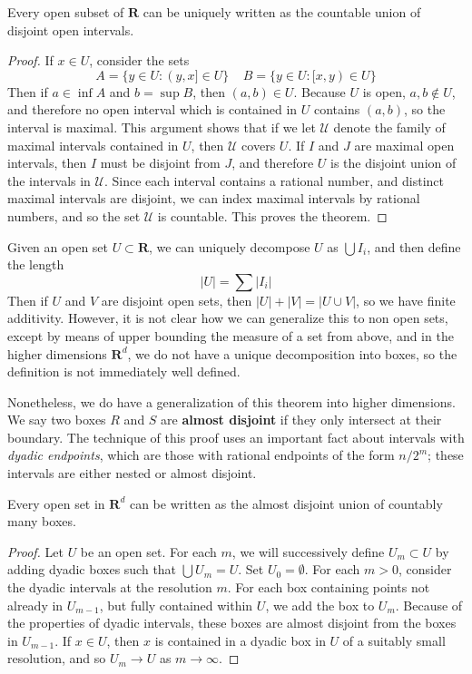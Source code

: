 \begin{theorem}
  Every open subset of $\mathbf{R}$ can be uniquely written as the countable union of disjoint open intervals.
\end{theorem}
\begin{proof}
  If $x \in U$, consider the sets
  \[ A = \{ y \in U: (y,x] \in U \}\ \ \ \ \ B = \{ y \in U: [x,y) \in U \} \]
  Then if $a \in \inf A$ and $b = \sup B$, then $(a,b) \in U$. Because $U$ is open, $a,b \not \in U$, and therefore no open interval which is contained in $U$ contains $(a,b)$, so the interval is maximal. This argument shows that if we let $\mathcal{U}$ denote the family of maximal intervals contained in $U$, then $\mathcal{U}$ covers $U$. If $I$ and $J$ are maximal open intervals, then $I$ must be disjoint from $J$, and therefore $U$ is the disjoint union of the intervals in $\mathcal{U}$. Since each interval contains a rational number, and distinct maximal intervals are disjoint, we can index maximal intervals by rational numbers, and so the set $\mathcal{U}$ is countable. This proves the theorem.
\end{proof}

Given an open set $U \subset \mathbf{R}$, we can uniquely decompose $U$ as $\bigcup I_i$, and then define the length
%
\[ |U| = \sum |I_i| \]
%
Then if $U$ and $V$ are disjoint open sets, then $|U| + |V| = |U \cup V|$, so we have finite additivity. However, it is not clear how we can generalize this to non open sets, except by means of upper bounding the measure of a set from above, and in the higher dimensions $\mathbf{R}^d$, we do not have a unique decomposition into boxes, so the definition is not immediately well defined.

Nonetheless, we do have a generalization of this theorem into higher dimensions. We say two boxes $R$ and $S$ are {\bf almost disjoint} if they only intersect at their boundary. The technique of this proof uses an important fact about intervals with {\it dyadic endpoints}, which are those with rational endpoints of the form $n/2^m$; these intervals are either nested or almost disjoint.

\begin{theorem}
    Every open set in $\mathbf{R}^d$ can be written as the almost disjoint union of countably many boxes.
\end{theorem}
\begin{proof}
    Let $U$ be an open set. For each $m$, we will successively define $U_m \subset U$ by adding dyadic boxes such that $\bigcup U_m = U$. Set $U_0 = \emptyset$. For each $m > 0$, consider the dyadic intervals at the resolution $m$. For each box containing points not already in $U_{m-1}$, but fully contained within $U$, we add the box to $U_m$. Because of the properties of dyadic intervals, these boxes are almost disjoint from the boxes in $U_{m-1}$. If $x \in U$, then $x$ is contained in a dyadic box in $U$ of a suitably small resolution, and so $U_m \to U$ as $m \to \infty$.
\end{proof}

